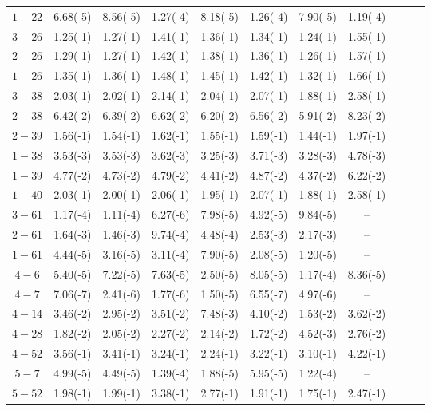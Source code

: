 \begin{table}
\begin{center}
\begin{tabular}{@{} l *8c *2c @{}}
 \multicolumn{1}{c}{ $ 1- 22$} &    6.68(-5) & 8.56(-5)& 1.27(-4) & 8.18(-5) &1.26(-4) & 7.90(-5) & 1.19(-4) \\
 \multicolumn{1}{c}{ $ 3- 26$} & 1.25(-1) & 1.27(-1) & 1.41(-1) & 1.36(-1) & 1.34(-1) & 1.24(-1) & 1.55(-1) \\
 \multicolumn{1}{c}{ $2 - 26$} &  1.29(-1) & 1.27(-1)  & 1.42(-1) & 1.38(-1) & 1.36(-1) & 1.26(-1) & 1.57(-1) \\
 \multicolumn{1}{c}{ $1 - 26$} &  1.35(-1) & 1.36(-1) & 1.48(-1) & 1.45(-1) & 1.42(-1) & 1.32(-1) & 1.66(-1) \\
 \multicolumn{1}{c}{ $ 3- 38$} &  2.03(-1) & 2.02(-1) & 2.14(-1) & 2.04(-1) & 2.07(-1) & 1.88(-1) & 2.58(-1) \\
 
 \multicolumn{1}{c}{ $2 - 38$} &  6.42(-2) & 6.39(-2) & 6.62(-2) & 6.20(-2) & 6.56(-2) & 5.91(-2) & 8.23(-2) \\
 \multicolumn{1}{c}{ $2 - 39$} &    1.56(-1) & 1.54(-1) & 1.62(-1) & 1.55(-1) & 1.59(-1)& 1.44(-1) & 1.97(-1) \\
 \multicolumn{1}{c}{ $1 - 38$} &  3.53(-3) & 3.53(-3) & 3.62(-3) & 3.25(-3) & 3.71(-3) & 3.28(-3) & 4.78(-3) \\
 \multicolumn{1}{c}{ $1 - 39$} &  4.77(-2) & 4.73(-2)& 4.79(-2) & 4.41(-2) & 4.87(-2) & 4.37(-2) & 6.22(-2) \\
 \multicolumn{1}{c}{ $1 - 40$} &   2.03(-1) & 2.00(-1) & 2.06(-1) & 1.95(-1) & 2.07(-1) & 1.88(-1) & 2.58(-1) \\
 
 \multicolumn{1}{c}{ $3 - 61$} &  1.17(-4) & 1.11(-4)  & 6.27(-6) & 7.98(-5) & 4.92(-5) & 9.84(-5) & -- \\
 \multicolumn{1}{c}{ $2 - 61$} &  1.64(-3) & 1.46(-3) & 9.74(-4) & 4.48(-4) & 2.53(-3)  & 2.17(-3) & -- \\
 \multicolumn{1}{c}{ $ 1- 61$} &  4.44(-5) & 3.16(-5) & 3.11(-4) & 7.90(-5) & 2.08(-5) & 1.20(-5) & -- \\
 \multicolumn{1}{c}{ $4 - 6$} &   5.40(-5) & 7.22(-5) & 7.63(-5) & 2.50(-5) & 8.05(-5) & 1.17(-4) & 8.36(-5) \\
 \multicolumn{1}{c}{ $4 - 7$} &   7.06(-7) &  2.41(-6)  & 1.77(-6) & 1.50(-5) &6.55(-7) & 4.97(-6) & -- \\
 
 \multicolumn{1}{c}{ $4 - 14$} &  3.46(-2) & 2.95(-2)  & 3.51(-2) & 7.48(-3) & 4.10(-2) & 1.53(-2) & 3.62(-2) \\
 \multicolumn{1}{c}{ $4 - 28$} &   1.82(-2) & 2.05(-2) & 2.27(-2) & 2.14(-2) & 1.72(-2) & 4.52(-3) & 2.76(-2) \\
 \multicolumn{1}{c}{ $4 - 52$} &  3.56(-1) &  3.41(-1) & 3.24(-1) & 2.24(-1) &  3.22(-1)& 3.10(-1) & 4.22(-1) \\
 \multicolumn{1}{c}{ $5 - 7$} &4.99(-5) & 4.49(-5)& 1.39(-4) & 1.88(-5) & 5.95(-5)  & 1.22(-4) & -- \\
 \multicolumn{1}{c}{ $ 5- 52$} &   1.98(-1) & 1.99(-1)  & 3.38(-1) & 2.77(-1) &1.91(-1)  & 1.75(-1) & 2.47(-1) \\
 

\end{tabular}
\end{center}
\end{table}
